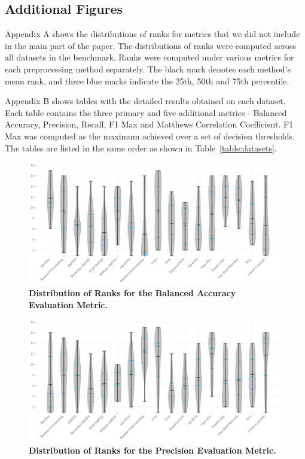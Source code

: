 \documentclass[conference]{IEEEtran}
\begin{document}
\begin{addmargin}[0.05\textwidth]{0.05\textwidth}
    \section{Additional Figures}

    Appendix A shows the distributions of ranks for metrics that we did not include in the main
    part of the paper. The distributions of ranks were computed across all datasets in the
    benchmark. Ranks were computed under various metrics for each preprocessing method separately.
    The black mark denotes each method’s mean rank, and three blue marks indicate the 25th, 50th
    and 75th percentile.

    Appendix B shows tables with the detailed results obtained on each dataset. Each table contains
    the three primary and five additional metrics - Balanced Accuracy, Precision, Recall, F1 Max
    and Matthews Correlation Coefficient. F1 Max was computed as the maximum achieved over a set of
    decision thresholds. The tables are listed in the same order as shown in
    Table~\ref{table:datasets}.
\end{addmargin}

\begin{figure}[H]
    \centering
    \includegraphics[width=0.9\linewidth]{plots/balanced_accuracy_ranks_distribution.pdf}
    \caption{\textbf{Distribution of Ranks for the Balanced Accuracy Evaluation Metric.}}
\end{figure}

\begin{figure}[H]
    \centering
    \includegraphics[width=0.9\linewidth]{plots/precision_ranks_distribution.pdf}
    \caption{\textbf{Distribution of Ranks for the Precision Evaluation Metric.}}
\end{figure}
\end{document}
